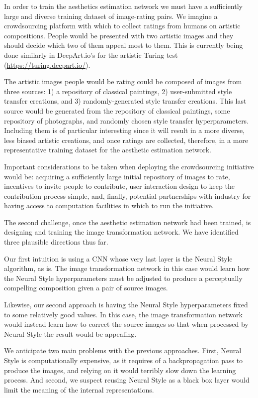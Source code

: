 In order to train the aesthetics estimation network we must have a sufficiently large and diverse training dataset of image-rating pairs.
We imagine a crowdsourcing platform with which to collect ratings from humans on artistic compositions.
People would be presented with two artistic images and they should decide which two of them appeal most to them.
This is currently being done similarly in DeepArt.io's for the artistic Turing test (\url{https://turing.deepart.io/}).

The artistic images people would be rating could be composed of images from three sources: 1) a repository of classical paintings, 2) user-submitted style transfer creations, and 3) randomly-generated style transfer creations.
This last source would be generated from the repository of classical paintings, some repository of photographs, and randomly chosen style transfer hyperparameters.
Including them is of particular interesting since it will result in a more diverse, less biased artistic creations, and once ratings are collected, therefore, in a more representative training dataset for the aesthetic estimation network.

Important considerations to be taken when deploying the crowdsourcing initiative would be: acquiring a sufficiently large initial repository of images to rate, incentives to invite people to contribute, user interaction design to keep the contribution process simple, and, finally, potential partnerships with industry for having access to computation facilities in which to run the initiative.

The second challenge, once the aesthetic estimation network had been trained, is designing and training the image transformation network.
We have identified three plausible directions thus far.

Our first intuition is using a CNN whose very last layer is the Neural Style algorithm, as is.
The image transformation network in this case would learn how the Neural Style hyperparameters must be adjusted to produce a perceptually compelling composition given a pair of source images.

Likewise, our second approach is having the Neural Style hyperparameters fixed to some relatively good values.
In this case, the image transformation network would instead learn how to correct the source images so that when processed by Neural Style the result would be appealing.

We anticipate two main problems with the previous approaches.
First, Neural Style is computationally expensive, as it requires of a backpropagation pass to produce the images, and relying on it would terribly slow down the learning process.
And second, we suspect reusing Neural Style as a black box layer would limit the meaning of the internal representations.

